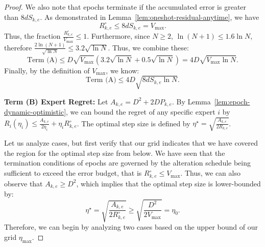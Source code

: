 \documentclass[journal,onecolumn]{IEEEtran}
\theoremstyle{plain}
\theoremstyle{definition}
\theoremstyle{remark}
\begin{document}
{\begin{proof}
We also note that epochs terminate if the accumulated error is greater than $8dS_{k,e}$. As demonstrated in Lemma~\ref{lem:oneshot-residual-anytime}, we have 
\begin{equation*}
R_{k,e}^{\circ} \le 8dS_{k,e} = V_{\max}.
\end{equation*}
Thus, the fraction $\frac{R_{k,e}^{\circ}}{V_{\max}} \le 1$. Furthermore, since $N \ge 2$, $\ln(N+1)\le 1.6\ln N$, therefore $\frac{2\ln(N+1)}{\sqrt{\ln N}}\le 3.2\sqrt{\ln N}$.
Thus, we combine these:
\begin{equation*}
\text{Term (A)} \le D \sqrt{V_{\max}} \left( 3.2\sqrt{\ln N} + 0.5\sqrt{\ln N} \right)
= 4 D \sqrt{V_{\max} \ln N}.
\end{equation*}
Finally, by the definition of $V_{\max}$, we know:
\begin{equation*}
\text{Term (A)} \le 4 D \sqrt{8dS_{k,e} \ln N}.
\end{equation*}

\textbf{Term (B) Expert Regret:}
Let $A_{k,e}=D^{2}+2DP_{k,e}$. By Lemma~\ref{lem:epoch-dynamic-optimistic}, we can bound the regret of any specific expert $i$ by $R_{i}(\eta_{i})\le\frac{A_{k,e}}{2\eta_{i}}+\eta_{i}R_{k,e}^{\circ}$.
The optimal step size is defined by $\eta^{\star}=\sqrt{\frac{A_{k,e}}{2R_{k,e}}}$.

Let us analyze cases, but first verify that our grid indicates that we have covered the region for the optimal step size from below.
We have seen that the termination conditions of epochs are governed by the alteration schedule being sufficient to exceed the error budget, that is $R_{k,e}^{\circ}\le V_{\max}$. Thus, we can also observe that $A_{k,e}\ge D^{2}$, which implies that the optimal step size is lower-bounded by:
\begin{equation*}
    \eta^\star = \sqrt{\frac{A_{k,e}}{2R_{k,e}^{\circ}}} \ge \sqrt{\frac{D^2}{2 V_{\max}}} = \eta_0.
\end{equation*}
Therefore, we can begin by analyzing two cases based on the upper bound of our grid $\eta_{\max}$.


\end{proof}}
\end{document}
